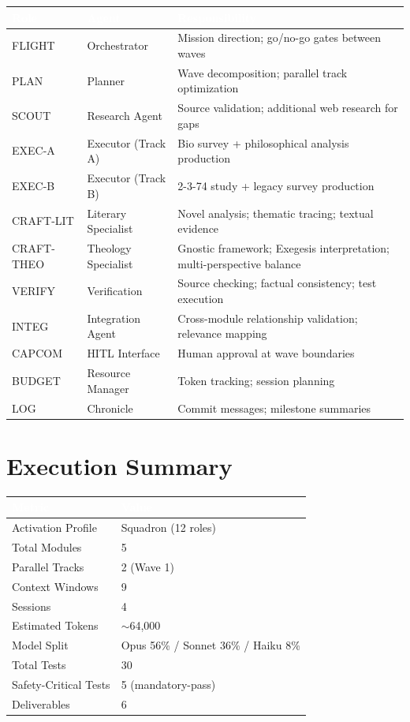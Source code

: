 \documentclass[11pt,letterpaper]{article}
\newcommand{\tableheader}[1]{\textbf{\sffamily\textcolor{white}{#1}}}
\begin{document}
\begin{center}
\begin{tabularx}{\textwidth}{L{2cm}L{2.5cm}X}
\toprule
{}
\tableheader{Role} & \tableheader{Agent} & \tableheader{Responsibility} \\
\midrule
FLIGHT & Orchestrator & Mission direction; go/no-go gates between waves \\
PLAN & Planner & Wave decomposition; parallel track optimization \\
SCOUT & Research Agent & Source validation; additional web research for gaps \\
EXEC-A & Executor (Track A) & Bio survey + philosophical analysis production \\
EXEC-B & Executor (Track B) & 2-3-74 study + legacy survey production \\
CRAFT-LIT & Literary Specialist & Novel analysis; thematic tracing; textual evidence \\
CRAFT-THEO & Theology Specialist & Gnostic framework; Exegesis interpretation; multi-perspective balance \\
VERIFY & Verification & Source checking; factual consistency; test execution \\
INTEG & Integration Agent & Cross-module relationship validation; relevance mapping \\
CAPCOM & HITL Interface & Human approval at wave boundaries \\
BUDGET & Resource Manager & Token tracking; session planning \\
LOG & Chronicle & Commit messages; milestone summaries \\
\bottomrule
\end{tabularx}
\end{center}

\section{Execution Summary}

\begin{center}
\begin{tabularx}{\textwidth}{L{5cm}X}
\toprule
{}
\tableheader{Metric} & \tableheader{Value} \\
\midrule
Activation Profile & Squadron (12 roles) \\
Total Modules & 5 \\
Parallel Tracks & 2 (Wave 1) \\
Context Windows & 9 \\
Sessions & 4 \\
Estimated Tokens & $\sim$64,000 \\
Model Split & Opus 56\% / Sonnet 36\% / Haiku 8\% \\
Total Tests & 30 \\
Safety-Critical Tests & 5 (mandatory-pass) \\
Deliverables & 6 \\
\bottomrule
\end{tabularx}
\end{center}
\end{document}
